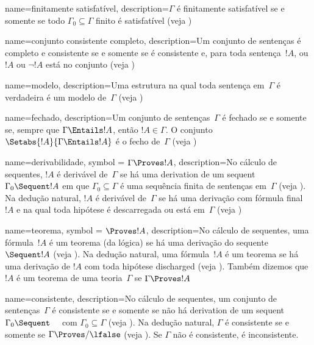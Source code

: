  {
  name={finitamente satisfatível},  
  description={$\Gamma$ é finitamente satisfatível se e somente se todo
    $\Gamma_0 \subseteq \Gamma$ finito é satisfatível (veja
    )} }

 {
  name=conjunto consistente completo,
  description={Um conjunto de {sentenças} é completo e consistente se e somente se
    é consistente e, para toda {sentença}~$!A$, ou $!A$ ou
    $\lnot !A$ está no conjunto (veja )} }

 {
  name=modelo,  
  description={Uma {estrutura} na qual toda {sentença}
    em~$\Gamma$ é verdadeira é um modelo de~$\Gamma$ (veja
    )} }

 {
  name=fechado, 
  description={Um conjunto de {sentenças}~$\Gamma$ é fechado se e somente se, sempre que
    $\Gamma \Entails !A$, então $!A \in \Gamma$. O conjunto
    $\Setabs{!A}{\Gamma \Entails !A}$ é o fecho de~$\Gamma$ (veja
    )} }

 {
  name=derivabilidade,
  symbol = {\ensuremath{\Gamma \Proves !A}},  
  description={No cálculo de sequentes, $!A$ é {derivável} de~$\Gamma$ se há uma
    \gls{derivation} de um \gls{sequent} $\Gamma_0 \Sequent !A$ 
    em que $\Gamma_0 \subseteq \Gamma$ é uma sequência finita de sentenças em~$\Gamma$ (veja
    ). Na dedução natural, $!A$ é {derivável} de~$\Gamma$ se há uma
    {derivação} com {fórmula} final~$!A$ e na qual toda
    hipótese é {descarregada} ou está em~$\Gamma$ (veja
    )} }

 {
  name={teorema},
  symbol = {\ensuremath{\Proves !A}},
  description={No cálculo de sequentes, uma {fórmula}~$!A$ é um teorema
    (da lógica) se há uma {derivação} do sequente $\Sequent !A$
    (veja ).  Na dedução natural, uma
    {fórmula}~$!A$ é um teorema se há uma {derivação} de $!A$
    com toda hipótese \gls{discharged}
    (veja ). Também dizemos que $!A$ é um
    teorema de uma teoria~$\Gamma$ se $\Gamma \Proves !A$} }

 {
  name=consistente,
  description={No cálculo de sequentes, um conjunto de sentenças~$\Gamma$ é
    consistente se e somente se não há \gls{derivation} de um \gls{sequent}
    $\Gamma_0 \Sequent \quad$ com $\Gamma_0 \subseteq \Gamma$
    (veja ). Na dedução natural, $\Gamma$
    é consistente se e somente se $\Gamma \Proves/ \lfalse$
    (veja ). Se $\Gamma$ não é consistente,
    é inconsistente.} }

